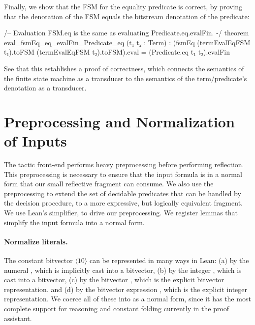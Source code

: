 Finally, we show that the FSM for the equality predicate is correct,
by proving that the denotation of the FSM equals the bitstream denotation of the predicate:

\begin{lean}
/-- Evaluation FSM.eq is the same as evaluating Predicate.eq.evalFin. -/
theorem eval_fsmEq_eq_evalFin_Predicate_eq (t₁ t₂ : Term) :
   (fsmEq (termEvalEqFSM t₁).toFSM (termEvalEqFSM t₂).toFSM).eval =
   (Predicate.eq t₁ t₂).evalFin
\end{lean}

See that this establishes a proof of correctness,
which connects the semantics of the finite state machine as a transducer
to the semantics of the term/predicate's denotation as a transducer.

\section{Preprocessing and Normalization of Inputs}
\label{sec:swbv:preprocessing}

The tactic front-end performs heavy preprocessing before performing reflection.
This preprocessing is necessary to ensure that the input formula is in a normal form that our small reflective fragment can consume.
We also use the preprocessing to extend the set of decidable predicates that can be handled by the decision procedure,
to a more expressive, but logically equivalent fragment.
We use Lean's simplifier,  to drive our preprocessing.
We register lemmas that simplify the input formula into a normal form.

\paragraph{Normalize literals.}
The constant bitvector $\langle10\rangle$ can be represented in many ways in Lean:
(a) by the numeral , which is implicitly cast into a bitvector,
(b) by the integer , which is cast into a bitvector,
(c) by the bitvector , which is the explicit bitvector representation.
and (d) by the bitvector expression , which is the explicit integer representation.
We coerce all of these into  as a normal form,
since it has the most complete support for reasoning and constant folding currently in the proof assistant.

